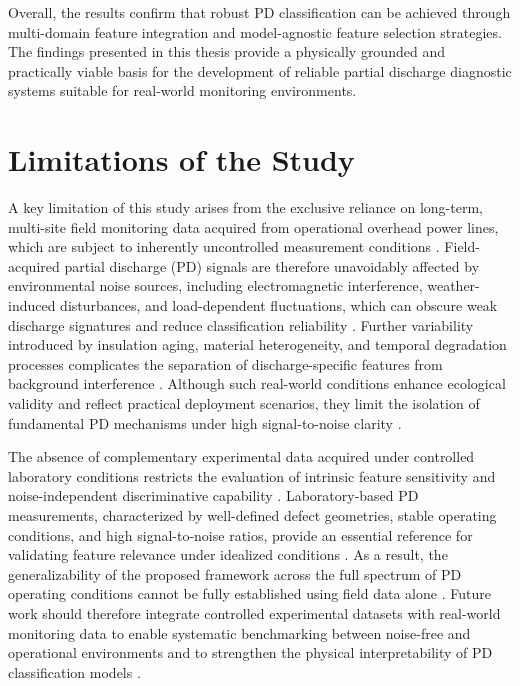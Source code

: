 Overall, the results confirm that robust PD classification can be achieved through multi-domain feature integration and model-agnostic feature selection strategies. The findings presented in this thesis provide a physically grounded and practically viable basis for the development of reliable partial discharge diagnostic systems suitable for real-world monitoring environments.


\section{Limitations of the Study}

A key limitation of this study arises from the exclusive reliance on long-term, multi-site field monitoring data acquired from operational overhead power lines, which are subject to inherently uncontrolled measurement conditions \parencite{Florkowski_2024, Sikorski_2025}. 
Field-acquired partial discharge (PD) signals are therefore unavoidably affected by environmental noise sources, including electromagnetic interference, weather-induced disturbances, and load-dependent fluctuations, which can obscure weak discharge signatures and reduce classification reliability \parencite{Orellana_2023_1, Florkowski_2024}. 
Further variability introduced by insulation aging, material heterogeneity, and temporal degradation processes complicates the separation of discharge-specific features from background interference \parencite{Seitz_2024_1, Sikorski_2025}. 
Although such real-world conditions enhance ecological validity and reflect practical deployment scenarios, they limit the isolation of fundamental PD mechanisms under high signal-to-noise clarity \parencite{Florkowski_2024, Long_2024}.

The absence of complementary experimental data acquired under controlled laboratory conditions restricts the evaluation of intrinsic feature sensitivity and noise-independent discriminative capability \parencite{Aldosari_2023, Long_2024}. 
Laboratory-based PD measurements, characterized by well-defined defect geometries, stable operating conditions, and high signal-to-noise ratios, provide an essential reference for validating feature relevance under idealized conditions \parencite{Aldosari_2023, Long_2024}. 
As a result, the generalizability of the proposed framework across the full spectrum of PD operating conditions cannot be fully established using field data alone \parencite{Seitz_2024_1, Florkowski_2024}. 
Future work should therefore integrate controlled experimental datasets with real-world monitoring data to enable systematic benchmarking between noise-free and operational environments and to strengthen the physical interpretability of PD classification models \parencite{Long_2024, Sikorski_2025}.

